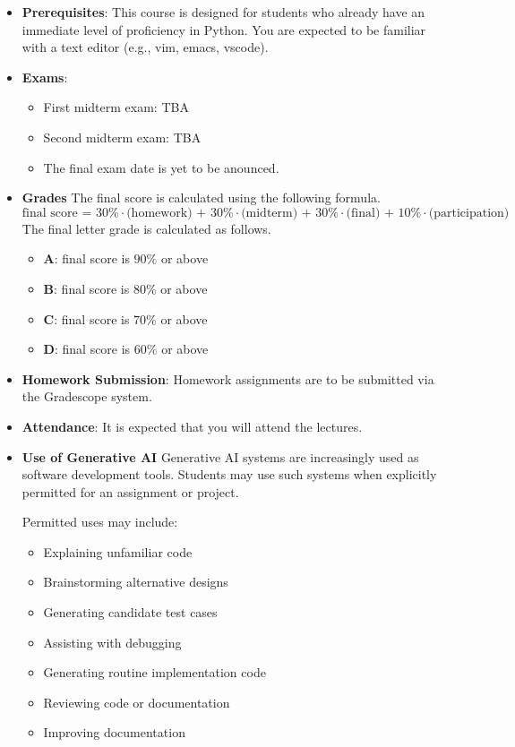 \documentclass[11pt]{article}
\begin{document}
\begin{itemize}
The central goal of this course is therefore not merely to make
students better programmers. It is to teach students to approach
software development as an **engineering discipline** in which
requirements, design, evidence, tradeoffs, process, and communication
are as important as writing code.

\item {\bf Prerequisites}:
This course is designed for students who already have an immediate
level of proficiency in Python. You are expected to be familiar with a
text editor (e.g., vim, emacs, vscode).

\item {\bf Exams}:
\begin{itemize}
\item
First midterm exam: TBA
\item
Second midterm exam: TBA
\item
The final exam date is yet to be anounced.
\end{itemize}

\item {\bf Grades}
The final score is calculated using the following formula.
\[\mbox{final score = 30\%$\cdot$(homework) + 30\%$\cdot$(midterm) + 30\%$\cdot$(final) + 10\%$\cdot$(participation)}\]
The final letter grade is calculated as follows.
\begin{itemize}
\item{\bf A}: final score is $90\%$ or above
\item{\bf B}: final score is $80\%$ or above
\item{\bf C}: final score is $70\%$ or above
\item{\bf D}: final score is $60\%$ or above
\end{itemize}

\item
{\bf Homework Submission}:
Homework assignments are to be submitted via the Gradescope system.

\item
{\bf Attendance}:
It is expected that you will attend the lectures.

\item
{\bf Use of Generative AI}
Generative AI systems are increasingly used as software development
tools. Students may use such systems when explicitly permitted for an
assignment or project.

Permitted uses may include:
\begin{itemize}
\item Explaining unfamiliar code
\item Brainstorming alternative designs
\item Generating candidate test cases
\item Assisting with debugging
\item Generating routine implementation code
\item Reviewing code or documentation
\item Improving documentation
\end{itemize}


\end{itemize}
\end{document}
